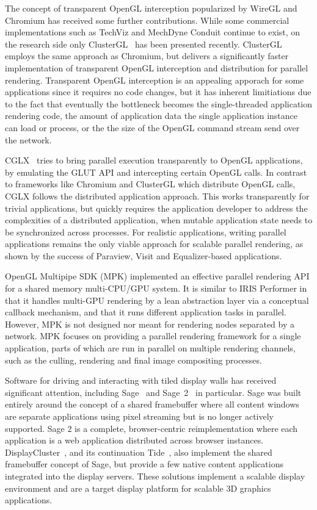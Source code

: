 The concept of transparent OpenGL interception popularized by WireGL and
Chromium has received some further contributions. While some commercial
implementations such as {TechViz} and {MechDyne Conduit} continue to exist, on
the research side only {ClusterGL}~\cite{NHM:11} has been presented recently.
{ClusterGL} employs the same approach as {Chromium}, but delivers a
significantly faster implementation of transparent OpenGL interception and
distribution for parallel rendering. Transparent OpenGL interception is an
appealing apporach for some applications since it requires no code changes, but
it has inherent limitiations due to the fact that eventually the bottleneck
becomes the single-threaded application rendering code, the amount of
application data the single application instance can load or process, or the the
size of the OpenGL command stream send over the network.

{CGLX}~\cite{DK:11} tries to bring parallel execution transparently to
OpenGL applications, by emulating the GLUT API and intercepting certain OpenGL
calls. In contrast to frameworks like {Chromium} and {ClusterGL}
which distribute OpenGL calls, {CGLX} follows the distributed application
approach. This works transparently for trivial applications, but quickly
requires the application developer to address the complexities of a distributed
application, when mutable application state needs to be synchronized across
processes. For realistic applications, writing parallel applications remains the
only viable approach for scalable parallel rendering, as shown by the success of
 {Paraview}, {Visit} and {Equalizer}-based applications.

OpenGL Multipipe SDK (MPK) \cite{BRE:05} implemented an effective parallel
rendering API for a shared memory multi-CPU/GPU system. It is similar to IRIS
Performer \cite{RH:94} in that it handles multi-GPU rendering by a lean
abstraction layer via a conceptual callback mechanism, and that it runs
different application tasks in parallel. However, MPK is not designed nor meant
for rendering nodes separated by a network. MPK focuses on providing a parallel
rendering framework for a single application, parts of which are run in parallel
on multiple rendering channels, such as the culling, rendering and final image
compositing processes.

Software for driving and interacting with tiled display walls has received
significant attention, including {Sage}~\cite{Sage} and
 {Sage~2}~\cite{Sage2} in particular. {Sage} was built entirely
around the concept of a shared framebuffer where all content windows are
separate applications using pixel streaming but is no longer actively supported.
{Sage 2} is a complete, browser-centric reimplementation where each
application is a web application distributed across browser instances.
{DisplayCluster}~\cite{DisplayCluster}, and its continuation
 {Tide}~\cite{tide}, also implement the shared framebuffer concept of
 {Sage}, but provide a few native content applications integrated into the
display servers. These solutions implement a scalable display environment and
are a target display platform for scalable 3D graphics applications.

